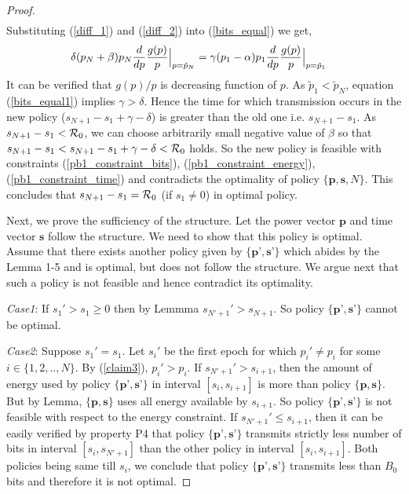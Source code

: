 \begin{proof}
\begin{align}
\end{align}
Substituting (\ref{diff_1}) and (\ref{diff_2}) into (\ref{bits_equal}) we get,
\begin{align}
&\delta(p_N+\beta)p_N\frac{d}{dp} \frac{g(p)}{p} \Big{\vert}_{p=\tilde{p}_N}
=\gamma(p_1-\alpha)p_1\frac{d}{dp} \frac{g(p)}{p} \Big{\vert}_{p=\tilde{p}_1}\label{bits_equal1}
\end{align}
It can be verified that $g(p)/p$ is decreasing function of $p$. As $\tilde{p}_1<\tilde{p}_N$, equation (\ref{bits_equal1}) implies $\gamma >\delta$. Hence the time for which transmission occurs in the new policy ($s_{N+1}-s_1+\gamma-\delta$) is greater than the old one i.e. $s_{N+1}-s_1$. As $s_{N+1}-s_1<\mathcal{R}_0$, we can choose arbitrarily small negative value of $\beta$ so that $s_{N+1}-s_1<s_{N+1}-s_1+\gamma -\delta<\mathcal{R}_0$ holds. So the new policy is feasible with constraints  (\ref{pb1_constraint_bits}), (\ref{pb1_constraint_energy}), (\ref{pb1_constraint_time}) and contradicts the optimality of policy $\{\textbf{p},\textbf{s},N\}$. This concludes that $s_{N+1}-s_1=\mathcal{R}_0$ (if $s_1\neq 0$) in optimal policy.

Next, we prove the sufficiency of the structure. Let the power vector $\textbf{p}$ and time vector $\textbf{s}$ follow the structure. We need to show that this policy is optimal. Assume that there exists another policy given by $\{\textbf{p'},\textbf{s'}\}$ which abides by the Lemma 1-5 and is optimal, but does not follow the structure. We argue next that such a policy is not feasible and hence contradict its optimality. 

\textit{Case1}: If $s_1'>s_1\ge 0$ then by Lemmma  $s_{N'+1}'>s_{N+1}$. So policy $\{\textbf{p'},\textbf{s'}\}$ cannot be optimal. 

\textit{Case2}: Suppose $s_1'=s_1$. Let $s_i'$ be the first epoch for which $p_i'\ne p_i$ for some $i \in \{1,2,..,N\}$. By (\ref{claim3}), $p_i'>p_i$. If $s_{N'+1}'>s_{i+1}$, then the amount of energy used by policy $\{ \textbf{p'},\textbf{s'}\}$ in interval $[s_{i},s_{i+1}]$ is more than policy $\{\textbf{p},\textbf{s}\}$. But by Lemma, $\{\textbf{p},\textbf{s}\}$ uses all energy available by $s_{i+1}$. So policy $\{\textbf{p'},\textbf{s'}\}$ is not feasible with respect to the energy constraint. If $s_{N'+1}'\le s_{i+1}$, then it can be easily verified by property P4 that policy $\{\textbf{p'},\textbf{s'}\}$ transmits strictly less number of bits in interval $[s_i,s_{N'+1}]$ than the other policy in interval $[s_{i},s_{i+1}]$. Both policies being same till $s_i$, we conclude that policy $\{\textbf{p'},\textbf{s'}\}$ transmits less than $B_0$  bits and therefore it is not optimal.


\end{proof}
